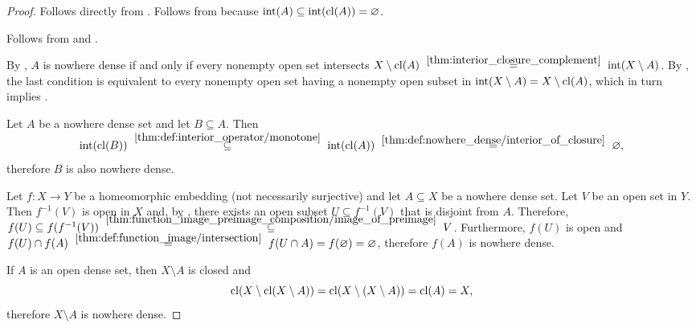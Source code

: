 \begin{proof}
   Follows directly from .
   Follows from  because \( \operatorname{int}(A) \subseteq \operatorname{int}(\operatorname{cl}(A)) = \varnothing \).

   Follows from  and .

   By , \( A \) is nowhere dense if and only if every nonempty open set intersects \( X \setminus \cl(A) \reloset {\ref{thm:interior_closure_complement}} = \Int(X \setminus A) \). By , the last condition is equivalent to every nonempty open set having a nonempty open subset in \( \operatorname{int}(X \setminus A) = X \setminus \operatorname{cl}(A) \), which in turn implies .

   Let \( A \) be a nowhere dense set and let \( B \subseteq A \). Then
  \begin{equation*}
    \Int(\cl(B))
    \reloset {\ref{thm:def:interior_operator/monotone}} \subseteq
    \Int(\cl(A))
    \reloset {\ref{thm:def:nowhere_dense/interior_of_closure}} =
    \varnothing,
  \end{equation*}
  therefore \( B \) is also nowhere dense.

   Let \( f: X \to Y \) be a homeomorphic embedding (not necessarily surjective) and let \( A \subseteq X \) be a nowhere dense set. Let \( V \) be an open set in \( Y \). Then \( f^{-1}(V) \) is open in \( X \) and, by , there exists an open subset \( U \subseteq f^{-1}(V) \) that is disjoint from \( A \). Therefore, \( f(U) \subseteq f(f^{-1}(V)) \reloset {\ref{thm:function_image_preimage_composition/image_of_preimage}} \subseteq V \). Furthermore, \( f(U) \) is open and \( f(U) \cap f(A) \reloset {\ref{thm:def:function_image/intersection}} = f(U \cap A) = f(\varnothing) = \varnothing \), therefore \( f(A) \) is nowhere dense.

   If \( A \) is an open dense set, then \( X \setminus A \) is closed and
  \begin{equation*}
    \operatorname{cl}(X \setminus \operatorname{cl}(X \setminus A))
    =
    \operatorname{cl}(X \setminus (X \setminus A))
    =
    \operatorname{cl}(A)
    =
    X,
  \end{equation*}
  therefore \( X \setminus A \) is nowhere dense.
\end{proof}

